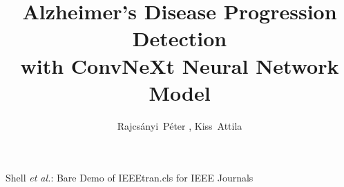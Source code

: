 \documentclass[journal]{IEEEtran}
\begin{document}
%
\title{Alzheimer's Disease Progression Detection \\ with ConvNeXt Neural Network Model}
%
%
%

\author{Rajcsányi~Péter ,
        Kiss~Attila }

% 
%



%
{Shell \MakeLowercase{\textit{et al.}}: Bare Demo of IEEEtran.cls for IEEE Journals}
% 
\end{document}
